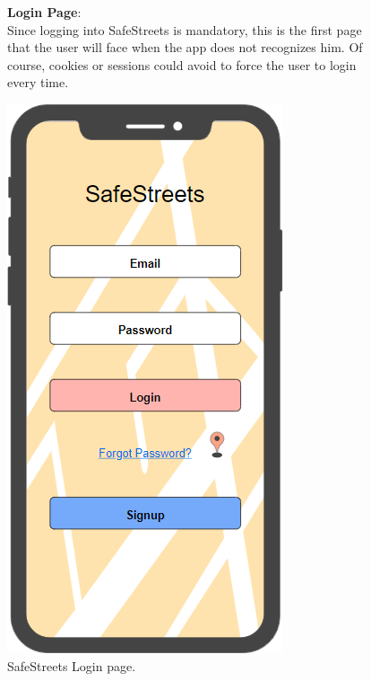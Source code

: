 \begin{figure}
	\begin{flushleft}
		\textbf{Login Page}:\\
		Since logging into SafeStreets is mandatory, this is the first page that the user will face when the app does not recognizes him. Of course, cookies or sessions could avoid to force the user to login every time.
	\end{flushleft}
	\centering
	\includegraphics[width=0.6\linewidth]{images/mockups/login}
	\caption{SafeStreets Login page.}
\label{fig:login}
\end{figure}
\clearpage
